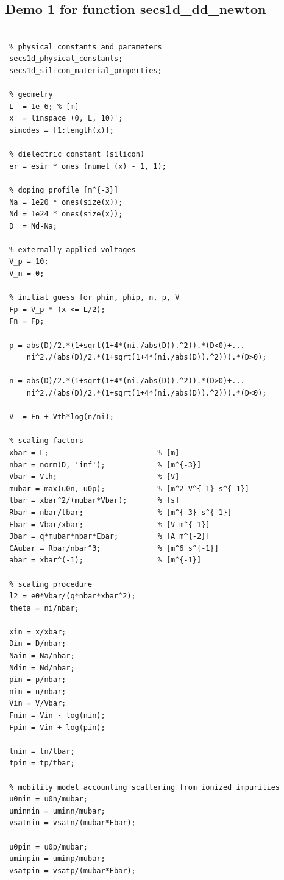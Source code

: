 \subsection{Demo 1 for function secs1d\_dd\_newton}
\begin{verbatim}

 % physical constants and parameters
 secs1d_physical_constants;
 secs1d_silicon_material_properties;
 
 % geometry
 L  = 1e-6; % [m] 
 x  = linspace (0, L, 10)';
 sinodes = [1:length(x)];
 
 % dielectric constant (silicon)
 er = esir * ones (numel (x) - 1, 1);
 
 % doping profile [m^{-3}]
 Na = 1e20 * ones(size(x));
 Nd = 1e24 * ones(size(x));
 D  = Nd-Na;  
 
 % externally applied voltages
 V_p = 10;
 V_n = 0;
  
 % initial guess for phin, phip, n, p, V
 Fp = V_p * (x <= L/2);
 Fn = Fp;
 
 p = abs(D)/2.*(1+sqrt(1+4*(ni./abs(D)).^2)).*(D<0)+...
     ni^2./(abs(D)/2.*(1+sqrt(1+4*(ni./abs(D)).^2))).*(D>0);
 
 n = abs(D)/2.*(1+sqrt(1+4*(ni./abs(D)).^2)).*(D>0)+...
     ni^2./(abs(D)/2.*(1+sqrt(1+4*(ni./abs(D)).^2))).*(D<0);
 
 V  = Fn + Vth*log(n/ni);

 % scaling factors
 xbar = L;                         % [m]
 nbar = norm(D, 'inf');            % [m^{-3}]
 Vbar = Vth;                       % [V]
 mubar = max(u0n, u0p);            % [m^2 V^{-1} s^{-1}]
 tbar = xbar^2/(mubar*Vbar);       % [s]
 Rbar = nbar/tbar;                 % [m^{-3} s^{-1}]
 Ebar = Vbar/xbar;                 % [V m^{-1}]
 Jbar = q*mubar*nbar*Ebar;         % [A m^{-2}]
 CAubar = Rbar/nbar^3;             % [m^6 s^{-1}]
 abar = xbar^(-1);                 % [m^{-1}]
 
 % scaling procedure
 l2 = e0*Vbar/(q*nbar*xbar^2);     
 theta = ni/nbar;                  
 
 xin = x/xbar;
 Din = D/nbar;
 Nain = Na/nbar;
 Ndin = Nd/nbar;
 pin = p/nbar;
 nin = n/nbar;
 Vin = V/Vbar;
 Fnin = Vin - log(nin);
 Fpin = Vin + log(pin);
 
 tnin = tn/tbar;
 tpin = tp/tbar;
 
 % mobility model accounting scattering from ionized impurities
 u0nin = u0n/mubar;
 uminnin = uminn/mubar;
 vsatnin = vsatn/(mubar*Ebar);
 
 u0pin = u0p/mubar;
 uminpin = uminp/mubar;
 vsatpin = vsatp/(mubar*Ebar);
 

\end{verbatim}
